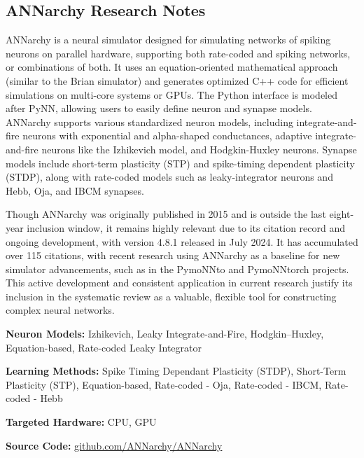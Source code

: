 \subsection*{ANNarchy Research Notes}\label{ANNarchy}

ANNarchy is a neural simulator designed for simulating networks of spiking neurons on parallel hardware, supporting both rate-coded and spiking networks, or combinations of both. It uses an equation-oriented mathematical approach (similar to the Brian simulator) and generates optimized C++ code for efficient simulations on multi-core systems or GPUs. The Python interface is modeled after PyNN, allowing users to easily define neuron and synapse models. ANNarchy supports various standardized neuron models, including integrate-and-fire neurons with exponential and alpha-shaped conductances, adaptive integrate-and-fire neurons like the Izhikevich model, and Hodgkin-Huxley neurons. Synapse models include short-term plasticity (STP) and spike-timing dependent plasticity (STDP), along with rate-coded models such as leaky-integrator neurons and Hebb, Oja, and IBCM synapses.

Though ANNarchy was originally published in 2015 and is outside the last eight-year inclusion window, it remains highly relevant due to its citation record and ongoing development, with version 4.8.1 released in July 2024. It has accumulated over 115 citations, with recent research using ANNarchy as a baseline for new simulator advancements, such as in the PymoNNto and PymoNNtorch projects. This active development and consistent application in current research justify its inclusion in the systematic review as a valuable, flexible tool for constructing complex neural networks.

\begin{tcolorbox}[enhanced,attach boxed title to top center={yshift=-3mm,yshifttext=-1mm}, colback=blue!5!white,colframe=blue!75!black,colbacktitle=red!80!black, title=ANNarchy at a Glance,fonttitle=\bfseries, boxed title style={size=small,colframe=red!50!black} ]

\textbf{Neuron Models:} Izhikevich, Leaky Integrate-and-Fire, Hodgkin–Huxley, Equation-based, Rate-coded Leaky Integrator

\textbf{Learning Methods:} Spike Timing Dependant Plasticity (STDP), Short-Term Plasticity (STP), Equation-based, Rate-coded - Oja, Rate-coded - IBCM, Rate-coded - Hebb  

\textbf{Targeted Hardware:} CPU, GPU 

\textbf{Source Code:} \href{https://github.com/ANNarchy/ANNarchy}{github.com/ANNarchy/ANNarchy}
\end{tcolorbox}
